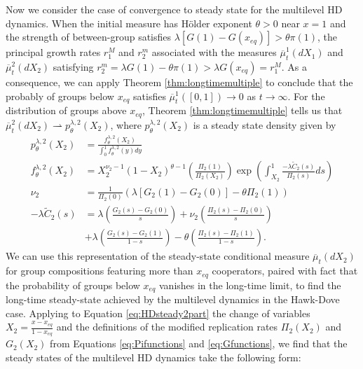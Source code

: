 \documentclass[11pt]{article}
\numberwithin{equation}{section}
\newcommand{\ol}{\overline}
\begin{document}
{Now we consider the case of convergence to steady state for the multilevel HD dynamics. When the initial measure has H{\"o}lder exponent $\theta > 0$ near $x=1$ and the strength of between-group satisfies $\lambda \left[ G(1) - G(x_{eq})\right] > \theta \pi(1)$, the principal growth rates $r_1^M$ and $r_2^m$ associated with the measures $\ol{\mu}^1_t(dX_1)$ and $\ol{\mu}^2_t(dX_2)$ satisfying $r_2^m = \lambda G(1) - \theta \pi(1) > \lambda G(x_{eq}) = r_1^M$. As a consequence, we can apply Theorem \ref{thm:longtimemultiple} to conclude that the probably of groups below $x_{eq}$ satisfies $\ol{\mu}^1_t([0,1]) \to 0$ as $t \to \infty$. For the distribution of groups above $x_{eq}$, Theorem \ref{thm:longtimemultiple} tells us that $\ol{\mu}_t^2(dX_2) \rightharpoonup p_{\theta}^{\lambda,2}(X_2)$, where
$p_{\theta}^{\lambda,2}(X_2)$ is a steady state density given by
\begin{subequations} \label{eq:HDsteady2part}
\begin{align}
p_{\theta}^{\lambda,2}(X_2) &= \frac{f^{\lambda,2}_{\theta}(X_2)}{\int_0^1 f^{\lambda,2}_{\theta}(y) dy} \\
f^{\lambda,2}_{\theta}(X_2) &= X_2^{\nu_2 -1} (1-X_2)^{\theta - 1} \left(\frac{\Pi_2(1)}{ \Pi_2(X_2)}\right) \exp\left( \int_{X_2}^1 \frac{-\lambda \tilde{C}_2(s)}{\Pi_2(s)} ds \right) \\ 
\nu_2 &= \frac{1}{\Pi_2(0)} \left( \lambda \left[ G_2(1) - G_2(0) \right] - \theta \Pi_2(1) \right) \\ 
- \lambda \tilde{C}_2(s) &= \lambda \left( \frac{G_2(s) - G_2(0)}{s} \right) + 
\nu_2 \left( \frac{\Pi_2(s) - \Pi_2(0)}{s} \right) \\  
&+ \lambda \left( \frac{G_2(s) - G_2(1) }{1 - s} \right) - \theta \left( \frac{\Pi_2(s) - \Pi_2(1)}{1 - s} \right) \nonumber.
\end{align}
\end{subequations}
We can use this representation of the steady-state conditional measure $\ol{\mu}_t(dX_2)$ for group compositions featuring more than $x_{eq}$ cooperators, paired with fact that the probability of groups below $x_{eq}$ vanishes in the long-time limit, to find the long-time steady-state achieved by the multilevel dynamics in the Hawk-Dove case. Applying to Equation \eqref{eq:HDsteady2part} the change of variables $X_2 = \frac{x-x_{eq}}{1 - x_{eq}}$ and the definitions of the modified replication rates $\Pi_2(X_2)$ and $G_2(X_2)$ from Equations \eqref{eq:Pifunctions} and \eqref{eq:Gfunctions}, we find that the steady states of the multilevel HD dynamics take the following form:
}
\end{document}
